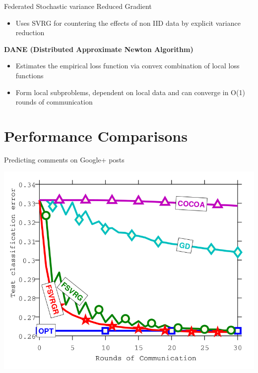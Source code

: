 \documentclass[10pt]{beamer}
\begin{document}
\begin{frame}{Federated Stochastic variance Reduced Gradient}
  \begin{itemize}
  \item Uses SVRG for countering the effects of non IID data by explicit
    variance reduction\cite{DBLP:journals/corr/KonecnyMRR16}
  \end{itemize}
  \textbf{DANE (Distributed Approximate Newton Algorithm)}
  \begin{itemize}
  \item Estimates the empirical loss function via convex combination of local
    loss functions
  \item Form local subproblems, dependent on local data and can converge in O(1)
    rounds of communication
  \end{itemize}

\end{frame}
\section{Performance Comparisons}
\begin{frame}{Predicting comments on Google+ posts}
  \begin{center}
    \includegraphics[height=0.7\textwidth]{fedsvrg.png}
  \end{center}

\end{frame}
\end{document}
